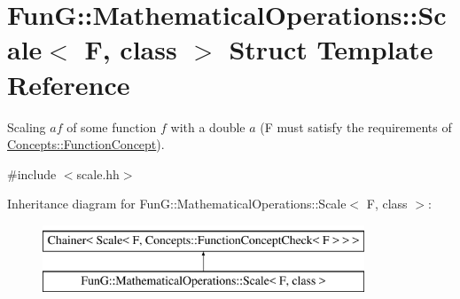 \hypertarget{structFunG_1_1MathematicalOperations_1_1Scale}{\section{Fun\-G\-:\-:Mathematical\-Operations\-:\-:Scale$<$ F, class $>$ Struct Template Reference}
\label{structFunG_1_1MathematicalOperations_1_1Scale}
}


Scaling $ af $ of some function $ f $ with a double $ a $ (F must satisfy the requirements of \hyperlink{structFunG_1_1Concepts_1_1FunctionConcept}{Concepts\-::\-Function\-Concept}).  




{\ttfamily \#include $<$scale.\-hh$>$}

Inheritance diagram for Fun\-G\-:\-:Mathematical\-Operations\-:\-:Scale$<$ F, class $>$\-:\begin{figure}[H]
\begin{center}
\leavevmode
\includegraphics[height=2.000000cm]{structFunG_1_1MathematicalOperations_1_1Scale}
\end{center}
\end{figure}
